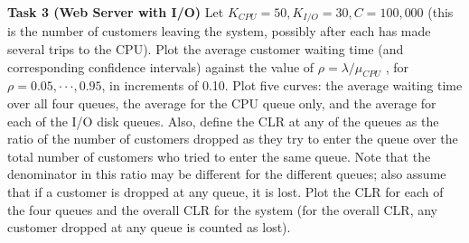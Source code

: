 \documentclass{article}
\begin{document}
\bigskip
\newpage





\textbf{Task 3 (Web Server with I/O)}
Let $K_{CPU} = 50, K_{I/O} = 30, C = 100, 000$ (this is the number of
customers leaving the system, possibly after each has made several trips to the CPU). Plot the average customer waiting time (and corresponding confidence intervals) against the value of $\rho = \lambda/\mu_{CPU}$ , for $\rho = 0.05, · · · , 0.95$, in increments of 0.10. Plot five curves: the average waiting time over all four queues, the average for the CPU queue only, and the average for each of the I/O disk queues. Also, define the CLR at any of the queues as the ratio of the number of customers dropped as they try to enter the queue over the total number of customers who tried to enter the same queue. Note that the denominator in this ratio may be different for the different queues; also assume that if a customer is dropped at any queue, it is lost. Plot the CLR for each of the four queues and the overall CLR for the system (for the overall CLR, any customer dropped at any queue is counted as lost).
\\
\end{document}
